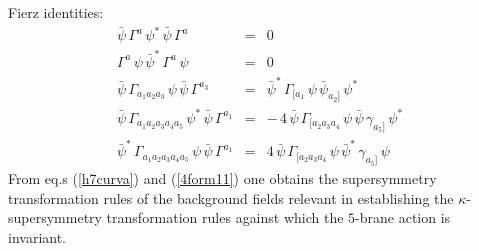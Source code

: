 \documentclass[a4paper,11pt]{article}
\begin{document}
Fierz identities:
\begin{eqnarray}
\bar{\psi} \, \Gamma^{a} \, \psi^{*} \, \bar{\psi} \, \Gamma^{a} & = & 0 \nonumber \\
\Gamma^{a} \, \psi \, \bar{\psi}^{*} \, \Gamma^{a} \, \psi & = & 0 \nonumber \\
\bar{\psi} \, \Gamma_{a_1 a_2 a_3} \, \psi \, \bar{\psi} \, \Gamma^{a_3} & = & \bar{\psi}^{*} \, \Gamma_{[a_1} \, \psi \, \bar{\psi}_{a_2]} \, \psi^{*} \nonumber \\
\bar{\psi} \, \Gamma_{a_1 a_2 a_3 a_4 a_5} \, \psi^{*} \, \bar{\psi} \, \Gamma^{a_1} & = & - \, 4 \, \bar{\psi} \, \Gamma_{[a_2 a_3 a_4} \, \psi \, \bar{\psi} \, \gamma_{a_5]} \, \psi^{*} \nonumber \\
\bar{\psi}^{*} \, \Gamma_{a_1 a_2 a_3 a_4 a_5} \, \psi \, \bar{\psi} \, \Gamma^{a_1} & = &  4 \, \bar{\psi} \, \Gamma_{[a_2 a_3 a_4} \, \psi \, \bar{\psi}^{*} \, \gamma_{a_5]} \, \psi
\end{eqnarray}
From eq.s (\ref{h7curva}) and (\ref{4form11}) one obtains the
supersymmetry transformation rules of the background fields relevant
in establishing the $\kappa$-supersymmetry transformation rules
against which the $5$-brane action is invariant.
\end{document}
